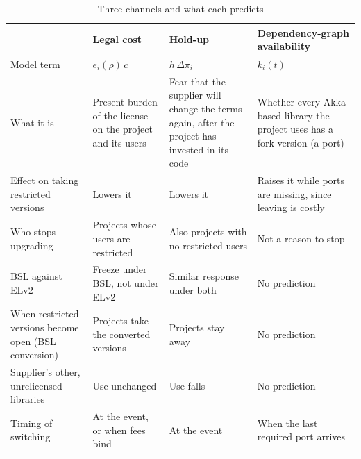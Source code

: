 \documentclass[11pt]{article}
\begin{document}
\begin{table}[t]
\centering
\begin{threeparttable}
\caption{Three channels and what each predicts}\label{tab:channels}
\footnotesize
\begin{tabularx}{\textwidth}{p{3.2cm}LLL}
\toprule
& Legal cost & Hold-up & Dependency-graph availability \\
\midrule
Model term & $e_i(\rho)\,c$ & $h\,\Delta\pi_i$ & $k_i(t)$ \\
What it is & Present burden of the license on the project and its users & Fear that the supplier will change the terms again, after the project has invested in its code & Whether every Akka-based library the project uses has a fork version (a port) \\
Effect on taking restricted versions & Lowers it & Lowers it & Raises it while ports are missing, since leaving is costly \\
Who stops upgrading & Projects whose users are restricted & Also projects with no restricted users & Not a reason to stop \\
BSL against ELv2 & Freeze under BSL, not under ELv2 & Similar response under both & No prediction \\
When restricted versions become open (BSL conversion) & Projects take the converted versions & Projects stay away & No prediction \\
Supplier's other, unrelicensed libraries & Use unchanged & Use falls & No prediction \\
Timing of switching & At the event, or when fees bind & At the event & When the last required port arrives \\
\bottomrule
\end{tabularx}
\end{threeparttable}
\end{table}
\end{document}
